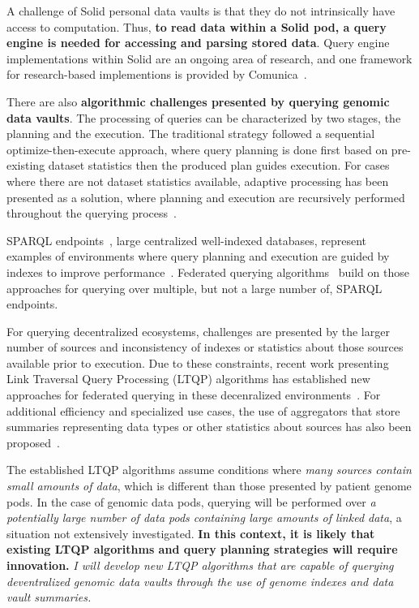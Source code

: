 \documentclass[a4paper,11pt]{article}
\begin{document}
\begin{refsection}
A challenge of Solid personal data vaults is that they do not intrinsically have access to computation. 
Thus, \textbf{to read data within a Solid pod, a query engine is needed for accessing and parsing stored data}.
Query engine implementations within Solid are an ongoing area of research, and one framework for research-based implementions is provided by Comunica~\cite{comunica}.

There are also \textbf{algorithmic challenges presented by querying genomic data vaults}.
The processing of queries can be characterized by two stages, the planning and the execution. 
The traditional strategy followed a sequential optimize-then-execute approach, where query planning is done first based on pre-existing dataset statistics then the produced plan guides execution. 
For cases where there are not dataset statistics available, adaptive processing has been presented as a solution, where planning and execution are recursively performed throughout the querying process~\cite{adaptive_book}.

SPARQL endpoints~\cite{spec:sparqlprot}, large centralized well-indexed databases, represent examples of environments where query planning and execution are guided by indexes to improve performance~\cite{sparqlqueryoptimization}.
Federated querying algorithms~\cite{hibiscus,tpf} build on those approaches for querying over multiple, but not a large number of, SPARQL endpoints.

For querying decentralized ecosystems, challenges are presented by the larger number of sources and inconsistency of indexes or statistics about those sources available prior to execution.
Due to these constraints, recent work presenting Link Traversal Query Processing (LTQP) algorithms has established new approaches for federated querying in these decenralized environments~\cite{taelman_LTQP_2023}.
For additional efficiency and specialized use cases, the use of aggregators that store summaries representing data types or other statistics about sources has also been proposed~\cite{VandenbrandeAggregatorsTR, taelman_privacyAgg_2020}.

The established LTQP algorithms assume conditions where \textit{many sources contain small amounts of data}, which is different than those presented by patient genome pods.
In the case of genomic data pods, querying will be performed over \textit{a potentially large number of data pods containing large amounts of linked data}, a situation not extensively investigated. 
\textbf{In this context, it is likely that existing LTQP algorithms and query planning strategies will require innovation.} 
\emph{I will develop new LTQP algorithms that are capable of querying deventralized genomic data vaults through the use of genome indexes and data vault summaries.}


\end{refsection}
\end{document}
